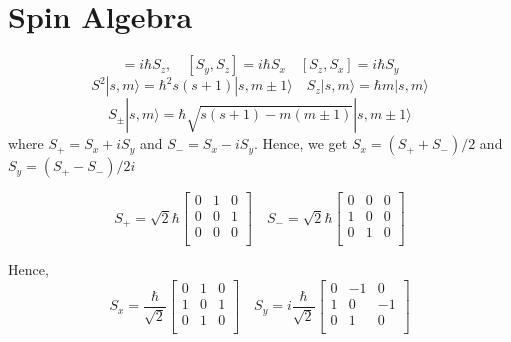 \documentclass[11pt,a4paper]{article}
\begin{document}
\section{Spin Algebra}\label{sec.spin_alegbra}
\begin{equation}
[S_x, S_y]=i \hbar S_z, \quad [S_y, S_z]=i \hbar S_x \quad [S_z, S_x]=i \hbar S_y
\end{equation}
\begin{equation}
S^2|s ,m \rangle = \hbar^2 s(s+1)|s ,m\pm 1\rangle  \quad S_z|s ,m \rangle = \hbar m |s ,m \rangle
\end{equation}
\begin{equation}
S_{\pm}|s, m\rangle = \hbar\sqrt{s(s+1)-m(m \pm 1)}|s,m \pm 1\rangle
\end{equation}
where $S_+ = S_x + iS_y$ and $S_- = S_x - iS_y $. Hence, we get $S_x = (S_+ + S_-)/2$ and $S_y = (S_+ - S_-)/2i $

\begin{equation}
S_+= \sqrt{2} \hbar\begin{bmatrix}
0 & 1 & 0\\
0 & 0 & 1\\
0 & 0 & 0\\
\end{bmatrix}
\quad
S_-=\sqrt{2} \hbar 
\begin{bmatrix}
0 & 0 & 0\\
1 & 0 & 0\\
0 & 1 & 0\\
\end{bmatrix}
\end{equation}

Hence,
\begin{equation}
S_x= \frac{\hbar}{\sqrt{2} }
\begin{bmatrix}
0 & 1 & 0\\
1 & 0 & 1\\
0 & 1 & 0\\
\end{bmatrix} \quad
S_y=  i \frac{\hbar}{\sqrt{2} }
\begin{bmatrix}
0 & -1 & 0\\
1 & 0 & -1\\
0 & 1 & 0\\
\end{bmatrix}
\end{equation}


 


%
\end{document}
